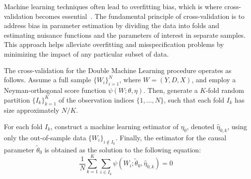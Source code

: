 Machine learning techniques often lead to overfitting bias, which is where cross-validation becomes essential~\citep{chernozhukov2018double}. The fundamental principle of cross-validation is to address bias in parameter estimation by dividing the data into folds and estimating nuisance functions and the parameters of interest in separate samples. This approach helps alleviate overfitting and misspecification problems by minimizing the impact of any particular subset of data.

The cross-validation for the Double Machine Learning procedure operates as follows. Assume a full sample $\{W_i\}_{i=1}^N$, where $W = (Y, D, X)$, and employ a Neyman-orthogonal score function $\psi(W; \theta, \eta)$. Then, generate a $K$-fold random partition $\{I_k\}_{k=1}^K$ of the observation indices $\{1, \ldots, N\}$, such that each fold $I_k$ has size approximately $N/K$.

For each fold $I_k$, construct a machine learning estimator of $\eta_0$, denoted $\hat{\eta}_{0,k}$, using only the out-of-sample data $\{W_i\}_{i \notin I_k}$. Finally, the estimator for the causal parameter $\tilde{\theta}_0$ is obtained as the solution to the following equation:
\[
\frac{1}{N} \sum_{k=1}^K \sum_{i \in I_k} \psi(W_i; \tilde{\theta}_0, \hat{\eta}_{0,k}) = 0
\]

